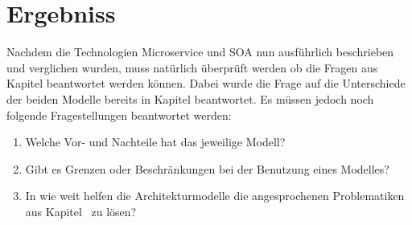 \chapter{Ergebniss}
\label{chap:Ergebniss}
Nachdem die Technologien Microservice und SOA nun ausführlich beschrieben und verglichen wurden, muss natürlich überprüft werden ob die Fragen aus Kapitel  beantwortet werden können. Dabei wurde die Frage auf die Unterschiede der beiden Modelle bereits in Kapitel  beantwortet. Es müssen jedoch noch folgende Fragestellungen beantwortet werden:

\begin{enumerate}
    \item Welche Vor- und Nachteile hat das jeweilige Modell?
    \item Gibt es Grenzen oder Beschränkungen bei der Benutzung eines Modelles?
    \item In wie weit helfen die Architekturmodelle die angesprochenen Problematiken aus Kapitel \ zu lösen?
\end{enumerate}


